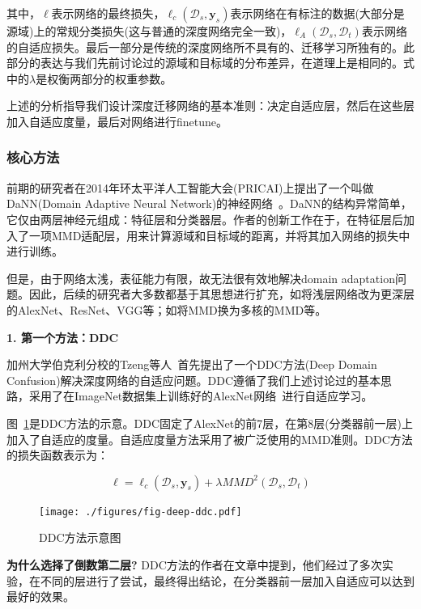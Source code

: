 其中，$\ell$表示网络的最终损失，$\ell_c(\mathcal{D}_s,\mathbf{y}_s)$表示网络在有标注的数据(大部分是源域)上的常规分类损失(这与普通的深度网络完全一致)，$\ell_A(\mathcal{D}_s,\mathcal{D}_t)$表示网络的自适应损失。最后一部分是传统的深度网络所不具有的、迁移学习所独有的。此部分的表达与我们先前讨论过的源域和目标域的分布差异，在道理上是相同的。式中的$\lambda$是权衡两部分的权重参数。

上述的分析指导我们设计深度迁移网络的基本准则：决定自适应层，然后在这些层加入自适应度量，最后对网络进行finetune。

\subsubsection{核心方法}

前期的研究者在2014年环太平洋人工智能大会(PRICAI)上提出了一个叫做DaNN(Domain Adaptive Neural Network)的神经网络~\cite{ghifary2014domain}。DaNN的结构异常简单，它仅由两层神经元组成：特征层和分类器层。作者的创新工作在于，在特征层后加入了一项MMD适配层，用来计算源域和目标域的距离，并将其加入网络的损失中进行训练。

但是，由于网络太浅，表征能力有限，故无法很有效地解决domain adaptation问题。因此，后续的研究者大多数都基于其思想进行扩充，如将浅层网络改为更深层的AlexNet、ResNet、VGG等；如将MMD换为多核的MMD等。

\textbf{1. 第一个方法：DDC}

加州大学伯克利分校的Tzeng等人~\cite{tzeng2014deep}首先提出了一个DDC方法(Deep Domain Confusion)解决深度网络的自适应问题。DDC遵循了我们上述讨论过的基本思路，采用了在ImageNet数据集上训练好的AlexNet网络~\cite{krizhevsky2012imagenet}进行自适应学习。

图~\ref{fig-deep-ddc}是DDC方法的示意。DDC固定了AlexNet的前7层，在第8层(分类器前一层)上加入了自适应的度量。自适应度量方法采用了被广泛使用的MMD准则。DDC方法的损失函数表示为：

\begin{equation}
	\label{eq-deep-ddc}
	\ell = \ell_c(\mathcal{D}_s,\mathbf{y}_s) + \lambda MMD^2(\mathcal{D}_s,\mathcal{D}_t)
\end{equation}

\begin{figure}[htbp]
	\centering
	\texttt{[image: ./figures/fig-deep-ddc.pdf]}
	\caption{DDC方法示意图}
	\label{fig-deep-ddc}
\end{figure}

\textbf{为什么选择了倒数第二层?} DDC方法的作者在文章中提到，他们经过了多次实验，在不同的层进行了尝试，最终得出结论，在分类器前一层加入自适应可以达到最好的效果。

